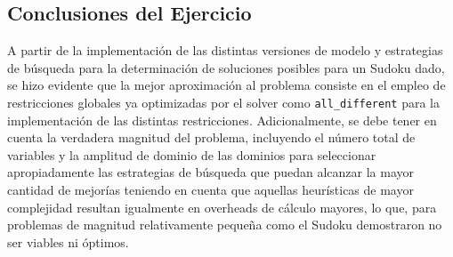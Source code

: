 \subsection{Conclusiones del Ejercicio}
A partir de la implementación de las distintas versiones de modelo y estrategias de búsqueda para la determinación de soluciones posibles para un Sudoku dado, se hizo evidente que la mejor aproximación al problema consiste en el empleo de restricciones globales ya optimizadas por el solver como \verb|all_different| para la implementación de las distintas restricciones. Adicionalmente, se debe tener en cuenta la verdadera magnitud del problema, incluyendo el número total de variables y la amplitud de dominio de las dominios para seleccionar apropiadamente las estrategias de búsqueda que puedan alcanzar la mayor cantidad de mejorías teniendo en cuenta que aquellas heurísticas de mayor complejidad resultan igualmente en overheads de cálculo mayores, lo que, para problemas de magnitud relativamente pequeña como el Sudoku demostraron no ser viables ni óptimos. 
